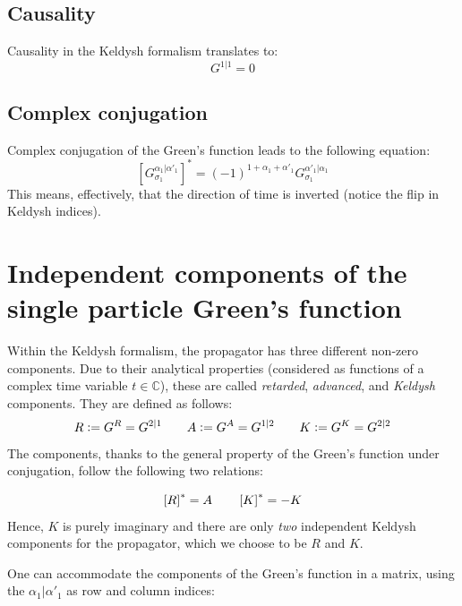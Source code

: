 \documentclass[12pt,a4paper,roman]{article}
\newcommand{\defeq}{\vcentcolon=}
\begin{document}
\subsection*{Causality}
Causality in the Keldysh formalism translates to:
\begin{equation}
G^{1|1} = 0
\end{equation}

\subsection*{Complex conjugation}
Complex conjugation of the Green's function leads to the following equation:
\begin{equation}
\left[ G^{\alpha_1|\alpha'_1}_{\sigma_1}\right]^* = (-1)^{1+\alpha_1+\alpha'_1}G^{\alpha'_1|\alpha_1}_{\sigma_1}
\end{equation}
This means, effectively, that the direction of time is inverted (notice the flip in Keldysh indices).


\section*{Independent components of the single particle Green's function}
Within the Keldysh formalism, the propagator has three different non-zero components. Due to their analytical properties (considered as functions of a complex time variable $t\in \mathbb{C}$), these are called \textit{retarded}, \textit{advanced}, and \textit{Keldysh} components. They are defined as follows:
\begin{equation}
R \defeq G^R = G^{2|1}  \hspace{0.7cm} A \defeq G^A = G^{1|2}\hspace{0.7cm} K \defeq G^K = G^{2|2}
\end{equation}
The components, thanks to the general property of the Green's function under conjugation, follow the following two relations:

\begin{equation}
\left[R\right]^* = A \hspace{0.7cm} \left[K\right]^* = -K
\end{equation}
Hence, $K$ is purely imaginary and there are only \textit{two} independent Keldysh components for the propagator, which we choose to be $R$ and $K$.

One can accommodate the components of the Green's function in a matrix, using the $\alpha_1|\alpha'_1$ as row and column indices:
\end{document}
